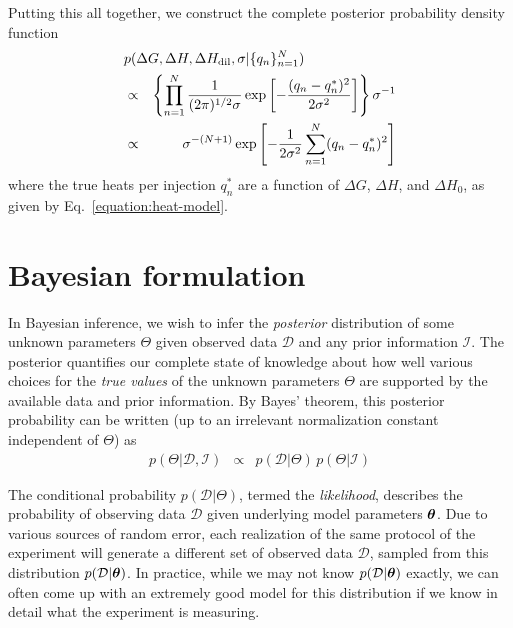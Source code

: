 \documentclass[aps,pre,twocolumn,nofootinbib,superscriptaddress,linenumbers]{revtex4-1}
\newcommand{\bfv}[1]{{\mbox{\boldmath{$#1$}}}}
\begin{document}
Putting this all together, we construct the complete posterior probability density function
\begin{eqnarray}
\lefteqn{p(\Delta G, \Delta H, \Delta H_\mathrm{dil}, \sigma | \{q_n\}_{n=1}^N)} \nonumber \\
&\propto& \left\{ \prod_{n=1}^N \frac{1}{(2 \pi)^{1/2} \sigma} \exp\left[- \frac{(q_n - q_n^*)^2}{2 \sigma^2}\right] \right\} \sigma^{-1} \nonumber \\
&\propto& \sigma^{-(N+1)} \exp\left[- \frac{1}{2 \sigma^2} \sum_{n=1}^N (q_n - q_n^*)^2\right] \label{equation:posterior}
\end{eqnarray}
where the true heats per injection $q_n^*$ are a function of $\Delta G$, $\Delta H$, and $\Delta H_0$, as given by Eq.~\ref{equation:heat-model}.
\color{black}

\section{Bayesian formulation}
\label{section:bayesian-formulation}

In Bayesian inference, we wish to infer the \emph{posterior} distribution of some unknown parameters $\Theta$ given observed data $\mathcal{D}$ and any prior information $\mathcal{I}$.
The posterior quantifies our complete state of knowledge about how well various choices for the \emph{true values} of the unknown parameters $\Theta$ are supported by the available data and prior information.
By Bayes' theorem, this posterior probability can be written (up to an irrelevant normalization constant independent of $\Theta$) as
\begin{eqnarray}
p(\Theta | \mathcal{D}, \mathcal{I}) &\propto& p(\mathcal{D} | \Theta) \, p(\Theta | \mathcal{I})
\end{eqnarray}

The conditional probability $p(\mathcal{D} | \Theta)$, termed the \emph{likelihood}, describes the probability of observing data $\mathcal{D}$ given underlying model parameters $\bfv{\theta}$.
Due to various sources of random error, each realization of the same protocol of the experiment will generate a different set of observed data $\mathcal{D}$, sampled from this distribution $p(\mathcal{D} | \bfv{\theta})$.
In practice, while we may not know $p(\mathcal{D} | \bfv{\theta})$ exactly, we can often come up with an extremely good model for this distribution if we know in detail what the experiment is measuring.
\end{document}
